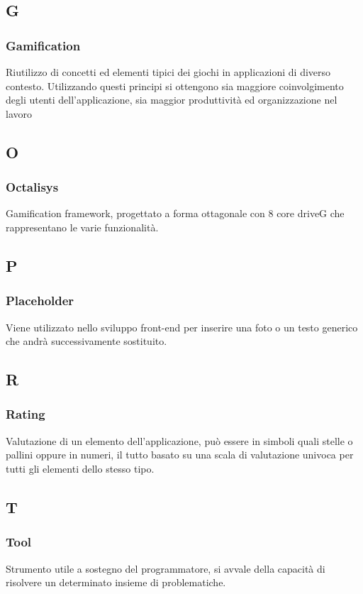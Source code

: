 \subsection*{G}
\subsubsection*{Gamification}
Riutilizzo di concetti ed elementi tipici dei giochi in applicazioni di diverso contesto. Utilizzando
questi principi si ottengono sia maggiore coinvolgimento degli utenti dell'applicazione, sia maggior
produttività ed organizzazione nel lavoro

\subsection*{O}
\subsubsection*{Octalisys}
Gamification framework, progettato a forma ottagonale con 8 core driveG che rappresentano le varie funzionalità.

\subsection*{P}
\subsubsection*{Placeholder}
Viene utilizzato nello sviluppo front-end per inserire una foto o un testo generico che andrà successivamente sostituito.

\subsection*{R}
\subsubsection*{Rating}
Valutazione di un elemento dell'applicazione, può essere in simboli quali stelle o pallini oppure in numeri, il tutto basato su una scala di valutazione univoca per tutti gli elementi dello stesso tipo.

\subsection*{T}
\subsubsection*{Tool}
Strumento utile a sostegno del programmatore, si avvale della capacità di risolvere un determinato insieme di problematiche.
